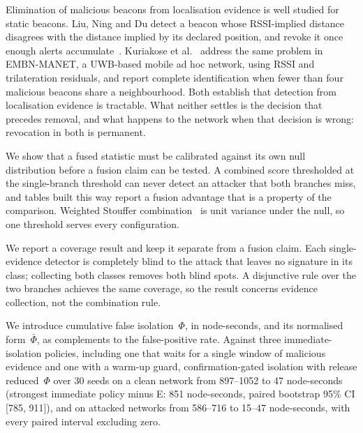 Elimination of malicious beacons from localisation evidence is well studied
for static beacons. Liu, Ning and Du detect a beacon whose RSSI-implied
distance disagrees with the distance implied by its declared position, and
revoke it once enough alerts accumulate~\cite{liu2005detecting}. Kuriakose
et al.~\cite{embn2023} address the same problem in EMBN-MANET, a UWB-based
mobile ad hoc network, using RSSI and trilateration residuals, and report
complete identification when fewer than four malicious beacons share a
neighbourhood. Both establish that detection from localisation evidence is
tractable. What neither settles is the decision that precedes removal, and
what happens to the network when that decision is wrong: revocation in
both is permanent.


\item We show that a fused statistic must be calibrated against its own
      null distribution before a fusion claim can be tested. A combined
      score thresholded at the single-branch threshold can never detect an
      attacker that both branches miss, and tables built this way report a
      fusion advantage that is a property of the comparison. Weighted
      Stouffer combination~\cite{stouffer1949,whitlock2005weighted} is unit
      variance under the null, so one threshold serves every
      configuration.

\item We report a coverage result and keep it separate from a fusion
      claim. Each single-evidence detector is completely blind to the
      attack that leaves no signature in its class; collecting both classes
      removes both blind spots. A disjunctive rule over the two branches
      achieves the same coverage, so the result concerns evidence
      collection, not the combination rule.

\item We introduce cumulative false isolation~$\Phi$, in node-seconds, and
      its normalised form~$\bar{\Phi}$, as complements to the
      false-positive rate. Against three immediate-isolation policies,
      including one that waits for a single window of malicious evidence
      and one with a warm-up guard, confirmation-gated isolation with
      release reduced~$\Phi$ over 30 seeds on a clean network from
      897--1052 to 47 node-seconds (strongest immediate policy minus E:
      851 node-seconds, paired bootstrap 95\% CI [785, 911]), and on
      attacked networks from 586--716 to 15--47 node-seconds, with every
      paired interval excluding zero.

